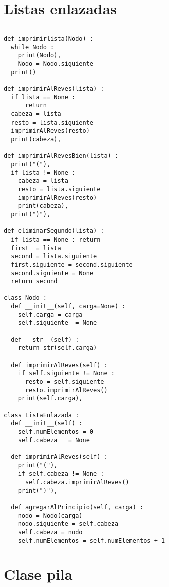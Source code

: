 \section{Listas enlazadas}
\begin{verbatim}

\end{verbatim}
\begin{verbatim}
def imprimirlista(Nodo) :
  while Nodo :
    print(Nodo),
    Nodo = Nodo.siguiente
  print()

def imprimirAlReves(lista) :
  if lista == None : 
      return
  cabeza = lista
  resto = lista.siguiente
  imprimirAlReves(resto)
  print(cabeza),

def imprimirAlRevesBien(lista) :
  print("("),
  if lista != None :
    cabeza = lista
    resto = lista.siguiente
    imprimirAlReves(resto)
    print(cabeza),
  print(")"),

def eliminarSegundo(lista) :
  if lista == None : return
  first  = lista
  second = lista.siguiente
  first.siguiente = second.siguiente
  second.siguiente = None
  return second

class Nodo :
  def __init__(self, carga=None) :
    self.carga = carga
    self.siguiente  = None

  def __str__(self) :
    return str(self.carga)

  def imprimirAlReves(self) :
    if self.siguiente != None :
      resto = self.siguiente
      resto.imprimirAlReves()
    print(self.carga),

class ListaEnlazada :
  def __init__(self) :
    self.numElementos = 0
    self.cabeza   = None

  def imprimirAlReves(self) :
    print("("),
    if self.cabeza != None :
      self.cabeza.imprimirAlReves()
    print(")"),

  def agregarAlPrincipio(self, carga) :
    nodo = Nodo(carga)
    nodo.siguiente = self.cabeza
    self.cabeza = nodo
    self.numElementos = self.numElementos + 1
\end{verbatim}

\section{Clase pila}

